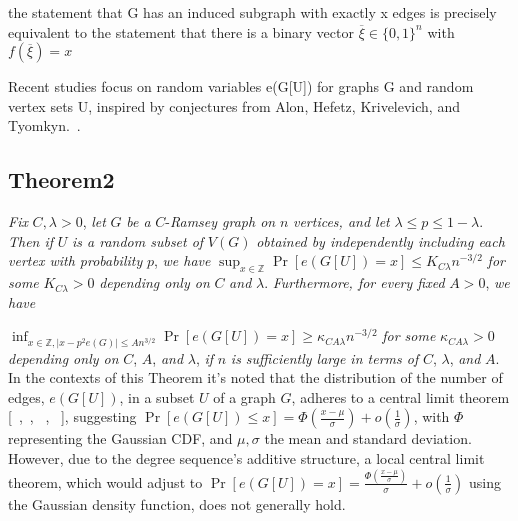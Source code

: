 the statement that G has an induced subgraph with exactly x edges is precisely equivalent to
the statement that there is a binary vector $\overline{\xi} \in \{ 0,1 \}^n $ with $f(\overline{\xi})=x $

Recent studies focus on random variables e(G[U]) for graphs G and random vertex sets U,
inspired by conjectures from Alon, Hefetz, Krivelevich, and Tyomkyn.~\cite{alon2020edge}.

\subsection{Theorem2}
\textit{Fix} $C, \lambda > 0$, \textit{let} $G$ \textit{be a} $C$-\textit{Ramsey graph on} $n$ \textit{vertices, and let} $\lambda \leq p \leq 1 - \lambda$. \textit{Then if} $U$ \textit{is a random subset of} $V(G)$ \textit{obtained by independently including each vertex with probability} $p$, \textit{we have}
$\sup_{x \in \mathbb{Z}} \Pr[e(G[U]) = x] \leq K_{C\lambda} n^{-3/2}$
\textit{for some} $K_{C\lambda} > 0$ \textit{depending only on} $C$ \textit{and} $\lambda$. \textit{Furthermore, for every fixed} $A > 0$, \textit{we have}

$
\inf_{x \in \mathbb{Z}, |x - p^2 e(G)| \leq An^{3/2}} \Pr[e(G[U]) = x] \geq \kappa_{C A \lambda} n^{-3/2}
$
\textit{for some} $\kappa_{C A \lambda} > 0$ \textit{depending only on} $C$, $A$, \textit{and} $\lambda$, \textit{if} $n$ \textit{is sufficiently large in terms of} $C$, $\lambda$, \textit{and} $A$.
In the contexts of this Theorem it's noted that
the distribution of the number of edges,
$e(G[U])$, in a subset $U$ of a graph $G$,
adheres to a central limit theorem [~\cite{berkowitz2018local},~\cite{berkowitz2016quantitative}, ~\cite{gilmer2016local},~\cite{gnedenko1948local} ], suggesting
$\Pr[e(G[U]) \leq x] = \Phi\left(\frac{x - \mu}{\sigma}\right) + o\left(\frac{1}{\sigma}\right)$,
with $\Phi$ representing the Gaussian CDF, and $\mu, \sigma$ the mean and standard deviation.
However, due to the degree sequence's additive structure,
a local central limit theorem, which would adjust to
$\Pr[e(G[U]) = x] = \frac{\Phi\left(\frac{x-\mu}{\sigma}\right)}{\sigma} +o\left(\frac{1}{\sigma}\right)$
using the Gaussian density function, does not generally hold.

